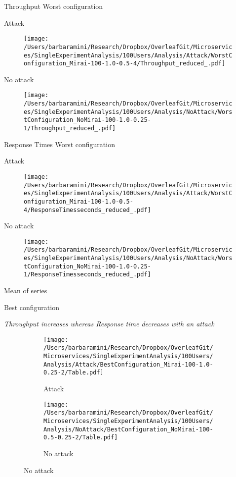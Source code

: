 \documentclass[10pt]{article}
\begin{document}
\break
Throughput Worst configuration \par
Attack 

\begin{figure}[h]
\texttt{[image: /Users/barbaramini/Research/Dropbox/OverleafGit/Microservices/SingleExperimentAnalysis/100Users/Analysis/Attack/WorstConfiguration\_Mirai-100-1.0-0.5-4/Throughput\_reduced\_.pdf]}
\end{figure}

No attack
\begin{figure}[h]
\texttt{[image: /Users/barbaramini/Research/Dropbox/OverleafGit/Microservices/SingleExperimentAnalysis/100Users/Analysis/NoAttack/WorstConfiguration\_NoMirai-100-1.0-0.25-1/Throughput\_reduced\_.pdf]}
\end{figure}

\break
Response Times Worst configuration \par
Attack 

\begin{figure}[h]
\texttt{[image: /Users/barbaramini/Research/Dropbox/OverleafGit/Microservices/SingleExperimentAnalysis/100Users/Analysis/Attack/WorstConfiguration\_Mirai-100-1.0-0.5-4/ResponseTimesseconds\_reduced\_.pdf]}
\end{figure}
No attack
\begin{figure}[h]
\texttt{[image: /Users/barbaramini/Research/Dropbox/OverleafGit/Microservices/SingleExperimentAnalysis/100Users/Analysis/NoAttack/WorstConfiguration\_NoMirai-100-1.0-0.25-1/ResponseTimesseconds\_reduced\_.pdf]}
\end{figure}

\break
Mean of series\par
Best configuration \par
\textit{Throughput increases whereas Response time decreases with an attack}
\begin{figure}[h]
\begin{subfigure}{.5\textwidth}
\texttt{[image: /Users/barbaramini/Research/Dropbox/OverleafGit/Microservices/SingleExperimentAnalysis/100Users/Analysis/Attack/BestConfiguration\_Mirai-100-1.0-0.25-2/Table.pdf]}
\caption{Attack}
\end{subfigure}
\begin{subfigure}{.5\textwidth}
\texttt{[image: /Users/barbaramini/Research/Dropbox/OverleafGit/Microservices/SingleExperimentAnalysis/100Users/Analysis/NoAttack/BestConfiguration\_NoMirai-100-0.5-0.25-2/Table.pdf]}
\caption{No attack}
\end{subfigure}
\end{figure}
\end{document}
